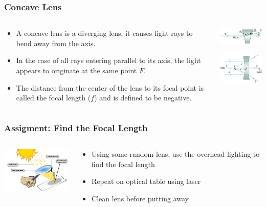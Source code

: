 \documentclass{beamer}
\begin{document}
\begin{frame}\frametitle{Concave Lens}
\begin{columns}
\begin{column}{6cm}
\begin{itemize}
\item A concave lens is a diverging lens, it causes light rays to bend away from the axis.
\item In the case of all rays entering parallel to its axis, the light appears to originate at the same point $F$.
\item The distance from the center of the lens to its focal point is called the focal length ($f$) and is defined to be negative.
\end{itemize}
\end{column}
\begin{column}{5cm}
\begin{center}
\includegraphics[width=4cm]{fig/concave1.jpg}

\vspace{0.25cm}
\includegraphics[width=4cm]{fig/concave2.jpg}
\end{center}
\end{column}
\end{columns}
\end{frame}


\begin{frame}\frametitle{Assigment: Find the Focal Length}
\begin{columns}
\begin{column}{4.6cm}
\begin{center}
\includegraphics[width=4.5cm]{fig/sunfire.jpg}
\end{center}
\end{column}
\begin{column}{7.4cm}
\begin{itemize}
\item Using some random lens, use the overhead lighting to find the focal length
\item Repeat on optical table using laser
\item Clean lens before putting away
\end{itemize}
\end{column}
\end{columns}
\end{frame}
\end{document}
